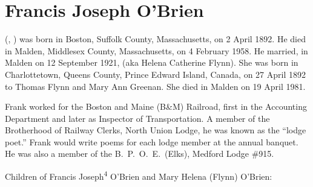 \section{Francis Joseph O'Brien}\label{per:Francis4OBrien}

 (, ) was born in Boston, Suffolk County, Massachusetts, on 2 April 1892.\cite{Francis4OBrienBirth} He died in Malden, Middlesex County, Massachusetts, on 4 February 1958.\cite{Francis4OBrienDeath} He married, in Malden on 12 September 1921,  (aka Helena Catherine Flynn).\cite{Francis4OBrienMarriageCert} She was born in Charlottetown, Queens County, Prince Edward Island, Canada, on 27 April 1892 to Thomas Flynn and Mary Ann Greenan.\cite{MaryFlynnBirth} She died in Malden on 19 April 1981.\cite{MaryFlynnDeath}

Frank worked for the Boston and Maine (B\&M) Railroad, first in the Accounting Department\cite{Francis4OBrienAccounting} and later as Inspector of Transportation.\cite{Francis4OBrienInspector} A member of the Brotherhood of Railway Clerks, North Union Lodge, he was known as the ``lodge poet.'' Frank would write poems for each lodge member at the annual banquet.\cite{Francis4OBrienPoet} He was also a member of the B.\ P.\ O.\ E.\ (Elks), Medford Lodge \#915.\cite{Francis4OBrienBPOE}

\begin{KidsIntro}
	Children of Francis Joseph\textsuperscript{4} O'Brien and Mary Helena (Flynn) O'Brien:
\end{KidsIntro}

